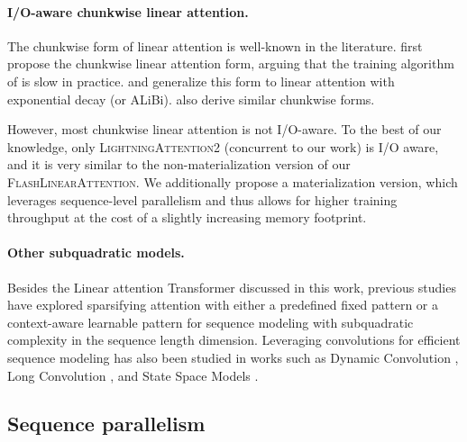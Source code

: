\paragraph{I/O-aware chunkwise linear attention.} 

The chunkwise form of  linear attention is well-known in the literature.  \citet{GAU} first propose the chunkwise linear attention form, arguing that the training algorithm of \citet{katharopoulos2020transformers} is slow in practice. 
\citet{sun2023retentive} and \citet{lightning2} generalize this form to linear attention with exponential decay (or ALiBi).  \citet{polysketch,VQ-Transformer} also derive similar chunkwise forms.

 However, most chunkwise linear attention is not I/O-aware. To the best of our knowledge, only \textsc{LightningAttention2} \cite{lightning2} (concurrent to our work) is I/O aware, and it is very similar to the non-materialization version of our \textsc{FlashLinearAttention}.  We additionally propose a materialization version, which leverages sequence-level parallelism and thus allows for higher training throughput at the cost of a slightly increasing memory footprint.  


\paragraph{Other subquadratic models.} Besides the Linear attention Transformer \cite{katharopoulos2020transformers, linear-xmr-fastweight} discussed in this work, previous studies have explored sparsifying attention with either a predefined fixed pattern \cite{child2019generating, beltagy2020longformer, zaheer2020big} or a context-aware learnable pattern \cite{roy2020efficient, kitaev2020reformer, ren2023sparse} for sequence modeling with subquadratic complexity in the sequence length dimension. Leveraging convolutions for efficient sequence modeling has also been studied in works such as Dynamic Convolution \cite{wu2019pay}, Long Convolution \cite{fu2023simple, qin2023toeplitz, hyena, massaroli2023laughing, li2023what, romero2021ckconv}, and State Space Models \cite{gu2021efficiently, gupta2022diagonal, gu2021combining, hasani2022liquid, s5, ma2023mega}.


\subsection{Sequence parallelism}

